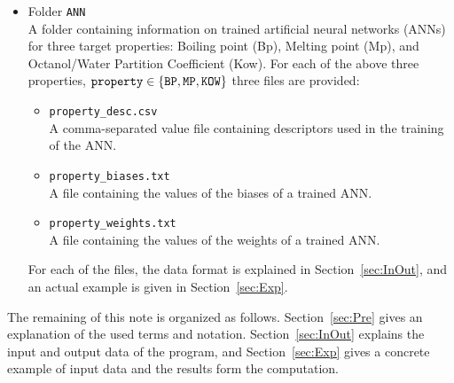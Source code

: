 \documentclass[11pt, titlepage, dvipdfmx, twoside]{article}
\begin{document}
\begin{itemize}
\begin{itemize}
\item Folder {\tt ANN}\\
A folder containing information on trained artificial neural networks (ANNs) for three target properties:
Boiling point (Bp), Melting point (Mp), and Octanol/Water Partition Coefficient (Kow).
For each of the above three properties, ${\tt property} \in \{{\tt BP, MP, KOW}\}$ three files are provided:
%
\begin{itemize}
\item {\tt property\_desc.csv}\\
A comma-separated value file containing descriptors
used in the training of the ANN.

\item {\tt property\_biases.txt}\\
A file containing the values of the biases of a trained ANN.

\item {\tt property\_weights.txt}\\
A file containing the values of the weights of a trained ANN.
\end{itemize}
%
For each of the files, the data format is explained in Section~\ref{sec:InOut},
and an actual example is given in Section~\ref{sec:Exp}.

% 
%
\end{itemize}
\end{itemize}



The remaining of this note is organized as follows.
Section~\ref{sec:Pre} gives an explanation 
of the used terms and notation.
%
Section~\ref{sec:InOut} explains the 
input and output data of the program,
and Section~\ref{sec:Exp} gives a concrete
example of input data and the results form the computation.
\end{document}
